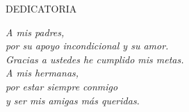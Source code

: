 \renewcommand{\thepage}{\Roman{page}}

\setcounter{page}{5} 

\vspace*{4cm}
 

\begin{center}
{\large DEDICATORIA}
\par\end{center}{\large \par}

\vspace*{4cm}


\noindent \begin{flushright}
\textit{A mis padres,}\\
\textit{por su apoyo incondicional y su amor. }\\
\textit{Gracias a ustedes he cumplido mis metas.}\\
\textit{A mis hermanas,}\\
\textit{por estar siempre conmigo}\\
\textit{y ser mis amigas más queridas.}\\
\vfill{}

\par\end{flushright}

{\large \newpage{}}
